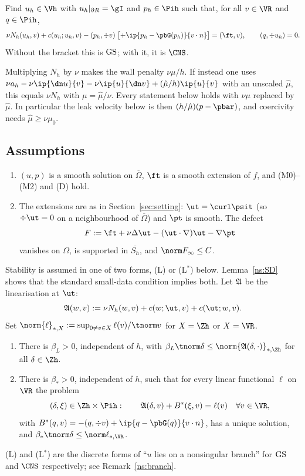 \begin{definition}\label{ns:def}
Find $u_h\in\Vh$ with $u_h|_{\partial R}=\gI$ and $p_h\in\Pih$ such that, for all $v\in\VR$ and $q\in\Pih$,
\[
\nu N_h(u_h,v)+c(u_h;u_h,v)-(p_h,\div v)\;\bigl[+\ip{p_h-\pbG(p_h)}{v\cdot n}\bigr]=(\ft,v),\qquad(q,\div u_h)=0 .
\]
Without the bracket this is $\mathrm{GS}$; with it, it is $\CNS$.
\end{definition}

\begin{remark}\label{ns:conv}
Multiplying $N_h$ by $\nu$ makes the wall penalty $\nu\mu/h$. If instead one uses $\nu a_h-\nu\ip{\dn u}{v}-\nu\ip{u}{\dn v}+(\hat\mu/h)\ip{u}{v}$ with an unscaled $\hat\mu$, this equals $\nu N_h$ with $\mu=\hat\mu/\nu$. Every statement below holds with $\nu\mu$ replaced by $\hat\mu$. In particular the leak velocity below is then $(h/\hat\mu)(p-\pbar)$, and coercivity needs $\hat\mu\ge\nu\mu_0$.
\end{remark}

\subsection{Assumptions}
\begin{assumption}\label{ns:ass}\leavevmode
\begin{enumerate}[label=(NS\arabic*)]
\item $(u,p)$ is a smooth solution on $\overline\Omega$, $\ft$ is a smooth extension of $f$, and (M0)--(M2) and (D) hold.
\item The extensions are as in Section~\ref{sec:setting}: $\ut=\curl\psit$ (so $\div\ut=0$ on a neighbourhood of $\overline\Omega$) and $\pt$ is smooth. The defect
\[
F:=\ft+\nu\Delta\ut-(\ut\cdot\nabla)\ut-\nabla\pt
\]
vanishes on $\Omega$, is supported in $\overline{S_h}$, and $\norm F_\infty\le C$.
\end{enumerate}
\end{assumption}

Stability is assumed in one of two forms, (L) or (L$^\ast$) below. Lemma~\ref{ns:SD} shows that the standard small-data condition implies both. Let $\mathfrak A$ be the linearisation at $\ut$:
\[
\Aop(w,v):=\nu N_h(w,v)+c(w;\ut,v)+c(\ut;w,v).
\]
Set $\norm{\ell}_{\ast,X}:=\sup_{0\ne v\in X}\ell(v)/\tnorm v$ for $X=\Zh$ or $X=\VR$.

\begin{enumerate}[label=(L\arabic*)]
\item[(L)] There is $\beta_L>0$, independent of $h$, with $\beta_L\tnorm\delta\le\norm{\Aop(\delta,\cdot)}_{\ast,\Zh}$ for all $\delta\in\Zh$.
\item[(L$^\ast$)] There is $\beta_\ast>0$, independent of $h$, such that for every linear functional $\ell$ on $\VR$ the problem
\[
(\delta,\xi)\in\Zh\times\Pih:\qquad \Aop(\delta,v)+B^\ast(\xi,v)=\ell(v)\quad\forall v\in\VR,
\]
with $B^\ast(q,v)=-(q,\div v)+\ip{q-\pbG(q)}{v\cdot n}$, has a unique solution, and $\beta_\ast\tnorm\delta\le\norm\ell_{\ast,\VR}$.
\end{enumerate}
(L) and (L$^\ast$) are the discrete forms of ``$u$ lies on a nonsingular branch'' for $\mathrm{GS}$ and $\CNS$ respectively; see Remark~\ref{ns:branch}.

